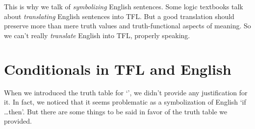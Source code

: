 This is why we talk of \emph{symbolizing} English sentences. Some logic textbooks talk about \emph{translating} English sentences into TFL. But a good translation should preserve more than mere truth values and truth-functional aspects of meaning.  So we can't really \emph{translate} English into TFL, properly speaking.

%



\section{Conditionals in TFL and English}\label{s:TFLConditional}

When we introduced the truth table for `\eif', we didn't provide any justification for it.  In fact, we noticed that it seems problematic as a symbolization of English `if \ldots then'.  But there are some things to be said in favor of the truth table we provided.



